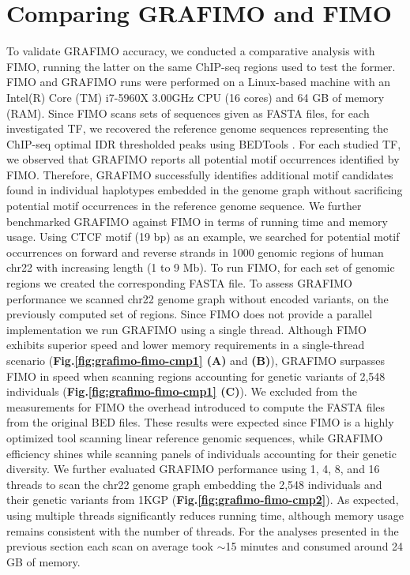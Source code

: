 \documentclass[a4paper, titlepage, openright]{book}
\newcommand{\grafimo}{GRAFIMO\xspace}
\begin{document}
\section{Comparing \grafimo and FIMO}
To validate \grafimo accuracy, we conducted a comparative analysis with FIMO, running the latter on the same ChIP-seq regions used to test the former. FIMO and \grafimo runs were performed on a Linux-based machine with an Intel(R) Core (TM) i7-5960X 3.00GHz CPU (16 cores) and 64 GB of memory (RAM). Since FIMO scans sets of sequences given as FASTA files, for each investigated TF, we recovered the reference genome sequences representing the ChIP-seq optimal IDR thresholded peaks using BEDTools \citep{quinlan2010bedtools}. For each studied TF, we observed that \grafimo reports all potential motif occurrences identified by FIMO. Therefore, \grafimo successfully identifies additional motif candidates found in individual haplotypes embedded in the genome graph without sacrificing potential motif occurrences in the reference genome sequence. We further benchmarked \grafimo against FIMO in terms of running time and memory usage. Using CTCF motif (19 bp) as an example, we searched for potential motif occurrences on forward and reverse strands in 1000 genomic regions of human chr22 with increasing length (1 to 9 Mb). To run FIMO, for each set of genomic regions we created the corresponding FASTA file. To assess \grafimo performance we scanned chr22 genome graph without encoded variants, on the previously computed set of regions. Since FIMO does not provide a parallel implementation we run \grafimo using a single thread. Although FIMO exhibits superior speed and lower memory requirements in a single-thread scenario (\textbf{Fig.\ref{fig:grafimo-fimo-cmp1} (A)} and \textbf{(B)}), \grafimo surpasses FIMO in speed when scanning regions accounting for genetic variants of 2,548 individuals (\textbf{Fig.\ref{fig:grafimo-fimo-cmp1} (C)}). We excluded from the measurements for FIMO the overhead introduced to compute the FASTA files from the original BED files. These results were expected since FIMO is a highly optimized tool scanning linear reference genomic sequences, while \grafimo efficiency shines while scanning panels of individuals accounting for their genetic diversity. We further evaluated \grafimo performance using 1, 4, 8, and 16 threads to scan the chr22 genome graph embedding the 2,548 individuals and their genetic variants from 1KGP (\textbf{Fig.\ref{fig:grafimo-fimo-cmp2}}). As expected, using multiple threads significantly reduces running time, although memory usage remains consistent with the number of threads. For the analyses presented in the previous section each scan on average took $\sim$15 minutes and consumed around 24 GB of memory. 
\end{document}
